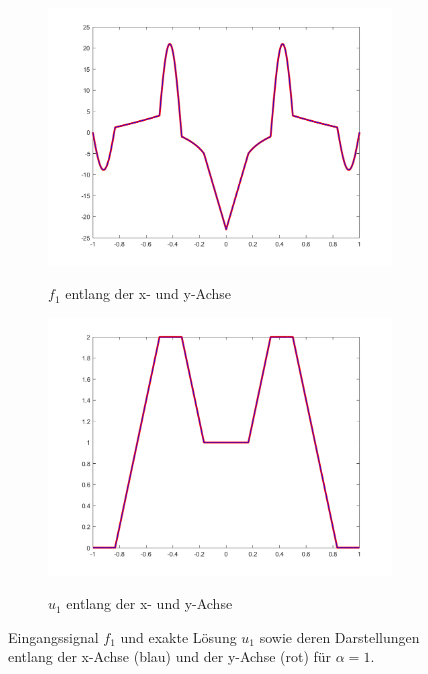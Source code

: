 \begin{figure}[!ht]
  \begin{subfigure}[b]{.48\linewidth}
    \caption{$f_1$ entlang der x- und y-Achse}
    \includegraphics[trim = 50 30 50 20, clip, width=\linewidth]
      {pictures/chapExperiments/secGeneralInfo/f01Plots/inSiAxis.png}
    \label{fig:f01InSiAxis}
  \end{subfigure}
  \quad
  \begin{subfigure}[b]{.48\linewidth}
    \caption{$u_1$ entlang der x- und y-Achse}
    \includegraphics[trim = 50 30 50 20, clip, width=\linewidth]
      {pictures/chapExperiments/secGeneralInfo/f01Plots/exactSolutionAxis.png}
    \label{fig:f01ExactSolAxis}
  \end{subfigure} 
  \caption{Eingangssignal $f_1$ und exakte Lösung $u_1$ sowie deren
  Darstellungen entlang der x-Achse (blau) und der y-Achse (rot) für
  $\alpha=1$.}
  \label{fig:f01Plots}
\end{figure}

